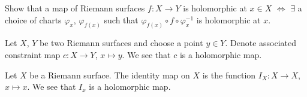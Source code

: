 \documentclass[12pt]{article}					%
\begin{document}
\begin{priklad}
	Show that a map of Riemann surfaces $f: X \rightarrow Y$ is holomorphic at $x \in X$ $\Leftrightarrow$ $\exists$ a choice of charts $φ_x$, $φ_{f(x)}$ such that $φ_{f(x)} ∘ f ∘ φ_x^{-1}$ is holomorphic at $x$.
\end{priklad}

\begin{priklad}[Eg]
	Let $X$, $Y$ be two Riemann surfaces and choose a point $y \in Y$. Denote associated constraint map $c: X \rightarrow Y$, $x \mapsto y$. We see that $c$ is a holomorphic map.
\end{priklad}

\begin{priklad}[Eg]
	Let $X$ be a Riemann surface. The identity map on $X$ is the function $I_X: X \rightarrow X$, $x \mapsto x$. We see that $I_x$ is a holomorphic map.
\end{priklad}
\end{document}
